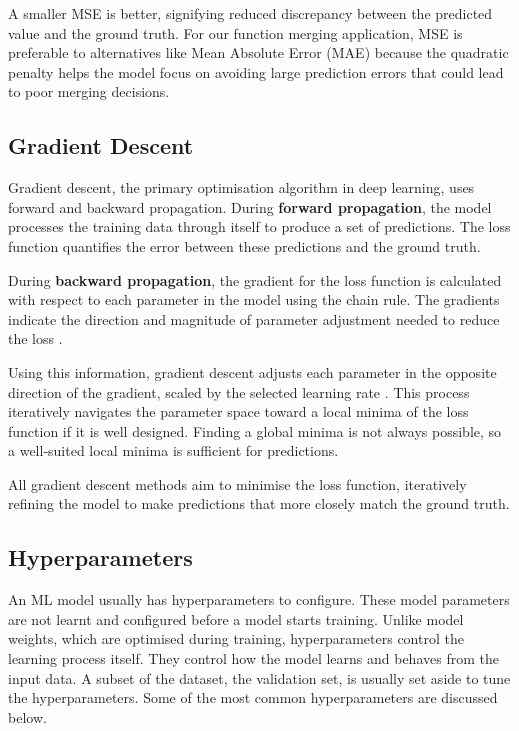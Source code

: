 A smaller MSE is better, signifying reduced discrepancy between the predicted value and the ground truth. For our function merging application, MSE is preferable to alternatives like Mean Absolute Error (MAE) because the quadratic penalty helps the model focus on avoiding large prediction errors that could lead to poor merging decisions.

\subsection{Gradient Descent} \label{ML:Gradients}
Gradient descent, the primary optimisation algorithm in deep learning, uses forward and backward propagation. During \textbf{forward propagation}, the model processes the training data through itself to produce a set of predictions. The loss function quantifies the error between these predictions and the ground truth.

During \textbf{backward propagation}, the gradient for the loss function is calculated with respect to each parameter in the model using the chain rule. The gradients indicate the direction and magnitude of parameter adjustment needed to reduce the loss \cite{GradientDescentBackpropagation1, GradientDescentBackPropagation2}.

Using this information, gradient descent adjusts each parameter in the opposite direction of the gradient, scaled by the selected learning rate \cite{DeepLearningGoodfellow}. This process iteratively navigates the parameter space toward a local minima of the loss function if it is well designed. Finding a global minima is not always possible, so a well-suited local minima is sufficient for predictions.

All gradient descent methods aim to minimise the loss function, iteratively refining the model to make predictions that more closely match the ground truth.

\subsection{Hyperparameters}
An ML model usually has hyperparameters to configure. These model parameters are not learnt and configured before a model starts training. Unlike model weights, which are optimised during training, hyperparameters control the learning process itself. They control how the model learns and behaves from the input data. A subset of the dataset, the validation set, is usually set aside to tune the hyperparameters. Some of the most common hyperparameters are discussed below.

